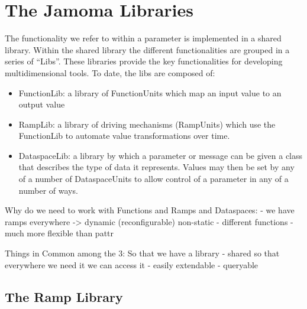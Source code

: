 \documentclass{article}
\begin{document}



\section{The Jamoma Libraries} %
\label{sec:the_jamoma_libraries}

The functionality we refer to within a parameter is implemented in a shared library. Within the shared library the different functionalities are grouped in a series of ``Libs''.  These libraries provide the key functionalities for developing multidimensional tools.  To date, the libs are composed of:
\begin{itemize}
	\item FunctionLib: a library of FunctionUnits which map an input value to an output value
	\item RampLib: a library of driving mechanisms (RampUnits) which use the FunctionLib to automate value transformations over time.
	\item DataspaceLib: a library by which a parameter or message can be given a class that describes the type of data it represents.  Values may then be set by any of a number of DataspaceUnits to allow control of a parameter in any of a number of ways.
\end{itemize}



Why do we need to work with Functions and Ramps and Dataspaces:
- we have ramps everywhere -> dynamic (reconfigurable) non-static
    - different functions
    - much more flexible than pattr
    

Things in Common among the 3:
So that we have a library
- shared so that everywhere we need it we can access it
- easily extendable
- queryable



\subsection{The Ramp Library} %
\label{sec:ramplib}
\end{document}
